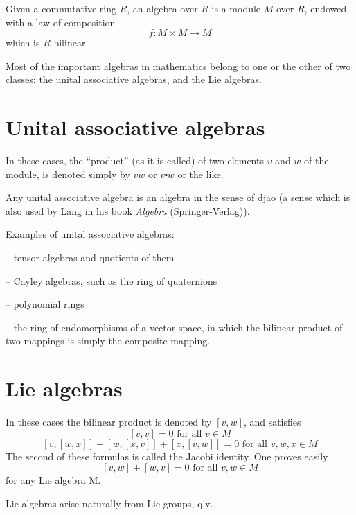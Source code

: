 \documentclass[12pt]{article}
\begin{document}
Given a commutative ring $R$, an algebra over $R$ is a
module $M$ over $R$, endowed with a law of composition
$$f:M\times M\to M$$
which is $R$-bilinear.

Most of the important algebras in mathematics belong to
one or the other of two classes: the unital associative
algebras, and the Lie algebras.

\section{Unital associative algebras}
In these cases, the ``product'' (as it is called) of two elements
$v$ and $w$ of the module, is denoted simply by $vw$ or $v\centerdot w$ or the
like.

Any unital associative algebra is an algebra in the sense of djao (a
sense which is also used by Lang in his book \emph{Algebra}
(Springer-Verlag)).

Examples of unital associative algebras:

-- tensor algebras and quotients of them

-- Cayley algebras, such as the ring of quaternions

-- polynomial rings

-- the ring of endomorphisms of a vector space, in which the bilinear
product of two mappings is simply the composite mapping.

\section{Lie algebras}
In these cases the bilinear product is denoted by $[v,w]$,
and satisfies
$$[v,v]=0\textrm{ for all }v\in M$$
$$[v,[w,x]]+[w,[x,v]]+[x,[v,w]]=0\textrm{ for all }v,w,x\in M$$
The second of these formulas is called the Jacobi identity. One proves
easily
$$[v,w]+[w,v]=0\textrm{ for all }v,w\in M$$
for any Lie algebra M.

Lie algebras arise naturally from Lie groups, q.v.
\end{document}
